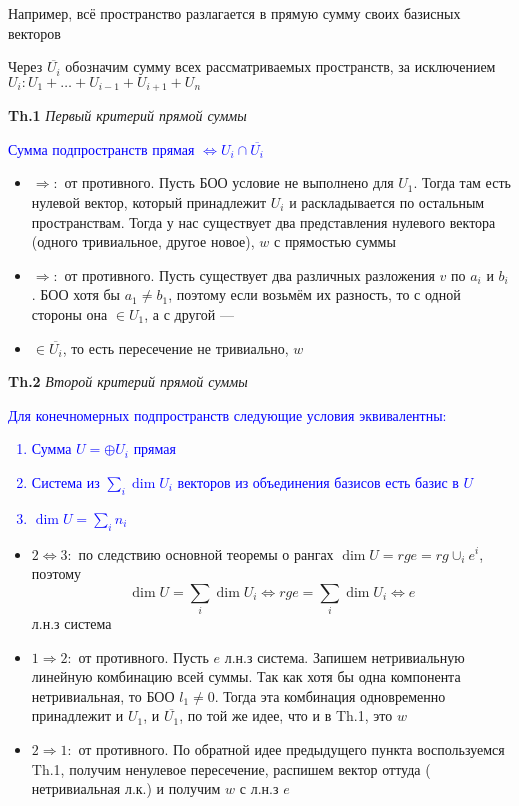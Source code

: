 Например, всё пространство разлагается в прямую сумму своих базисных векторов

Через $\overline{U_i}$ обозначим сумму всех рассматриваемых пространств, за исключением $U_i: U_1 + \dots + U_{i-1} +
U_{i+1} + U_n$

\textbf{Th.1} \textit{Первый критерий прямой суммы}

\textcolor{blue}{Сумма подпространств прямая $\Leftrightarrow U_i \cap \overline{U_i}$}

\begin{itemize}
    \item $\Rightarrow:$ от противного.
    Пусть БОО условие не выполнено для $U_1$.
    Тогда там есть нулевой вектор, который принадлежит $U_i$ и раскладывается по остальным пространствам.
    Тогда у нас существует два представления нулевого вектора (одного тривиальное, другое новое), $w$ с прямостью суммы
    \item $\Rightarrow:$ от противного.
    Пусть существует два различных разложения $v$ по $a_i$ и $b_i$.
    БОО хотя бы $a_1 \neq b_1$, поэтому если возьмём их разность, то с одной стороны она $\in U_1$, а с другой ---
    \item $\in \overline{U_i}$, то есть пересечение не тривиально, $w$
\end{itemize}

\textbf{Th.2} \textit{Второй критерий прямой суммы}

\textcolor{blue}{Для конечномерных подпространств следующие условия эквивалентны:
    \begin{enumerate}
        \item Сумма $U = \oplus U_i$ прямая
        \item Система из $\sum_i \dim U_i$ векторов из объединения базисов есть базис в $U$
        \item $\dim U = \sum_i n_i$
    \end{enumerate} }

\begin{itemize}
    \item $2 \Leftrightarrow 3:$ по следствию основной теоремы о рангах $\dim U = rg e = rg \cup_i e^i$, поэтому
    \[ \dim U = \sum_i \dim U_i \Leftrightarrow rg e = \sum_i \dim U_i \Leftrightarrow e \] л.н.з система
    \item $1 \Rightarrow 2:$ от противного.
    Пусть $e$ л.н.з система.
    Запишем нетривиальную линейную комбинацию всей суммы.
    Так как хотя бы одна компонента нетривиальная, то БОО $l_1 \neq 0$.
    Тогда эта комбинация одновременно принадлежит и $U_1$, и $\overline{U_1}$, по той же идее, что и в Th.1, это $w$
    \item $2 \Rightarrow 1:$ от противного.
    По обратной идее предыдущего пункта воспользуемся Th.1, получим ненулевое пересечение, распишем вектор оттуда (
    нетривиальная л.к.) и получим $w$ с л.н.з $e$
\end{itemize}

